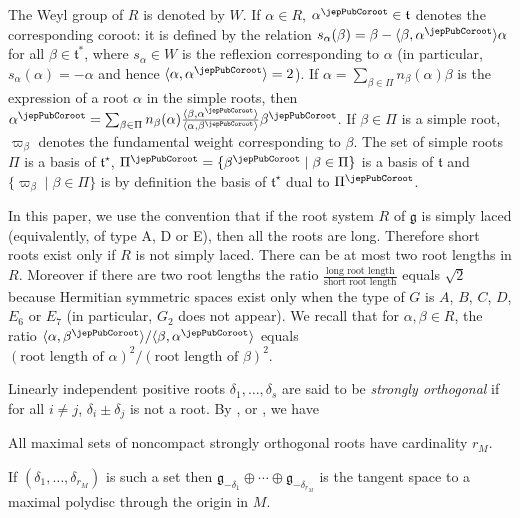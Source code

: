 The Weyl group of $R$ is denoted by $W$. If $\alpha\in R$, $\alpha^\jepPubCoroot\in\mathfrak t$ denotes the corresponding coroot: it is defined by the relation $s_\alpha(\beta)=\beta-\langle\beta,\alpha^\jepPubCoroot\rangle\alpha$ for all $\beta\in\mathfrak t^*$, where $s_\alpha\in W$ is the reflexion corresponding to $\alpha$ (in particular, $s_\alpha(\alpha)=-\alpha$ and hence $\langle\alpha,\alpha^\jepPubCoroot\rangle=2$). If $\alpha=\sum_{\beta\in\Pi}n_\beta(\alpha)\beta$ is the expression of a root $\alpha$ in the simple roots, then $\alpha^\jepPubCoroot=\sum_{\beta\in\Pi}n_\beta(\alpha)\frac{\langle\beta,\alpha^\jepPubCoroot\rangle}{\langle\alpha,\beta^\jepPubCoroot\rangle}\beta^\jepPubCoroot$. If $\beta\in\Pi$ is a simple root, $\varpi_\beta$ denotes the fundamental weight corresponding to $\beta$. The set of simple roots $\Pi$ is a basis of $\mathfrak t^{\star}$, $\Pi^\jepPubCoroot=\{\beta^\jepPubCoroot\mid\beta\in\Pi\}$ is a basis of $\mathfrak t$ and $\{\varpi_\beta\mid\beta\in\Pi\}$ is by definition the basis of $\mathfrak t^{\star}$ dual to $\Pi^\jepPubCoroot$.

In this paper, we use the convention that if the root system $R$ of $\mathfrak g$ is simply laced (equivalently, of type A, D or E), then all the roots are long. Therefore short roots exist only if $R$ is not simply laced. There can be at most two root lengths in $R$. Moreover if there are two root lengths the ratio $\frac{\text{long root length}}{\text{short root length}}$ equals $\sqrt2$ because Hermitian symmetric spaces exist only when the type of $G$ is $A$, $B$, $C$, $D$, $E_6$ or $E_7$ (in particular, $G_2$ does not appear). We recall that for $\alpha,\beta\in R$, the ratio $\langle\alpha,\beta^\jepPubCoroot\rangle/\langle\beta,\alpha^\jepPubCoroot\rangle$ equals $(\text{root length of }\alpha)^2/(\text{root length of }\beta)^2$.

Linearly independent positive roots $\delta_1,\ldots,\delta_s$ are said to be \emph{strongly orthogonal} if for all $i\neq j$, $\delta_i\pm\delta_j$ is not a root. By \cite{jep93HC56}, or \cite[Ch.~VIII, \S7]{jep93Hel01}, we have
\begin{fact}
All maximal sets of noncompact strongly orthogonal roots have cardinality $r_M$.
\end{fact}
If $(\delta_1,\ldots,\delta_{r_M})$ is such a set then $\mathfrak g_{-\delta_1}\oplus\cdots\oplus\mathfrak g_{-\delta_{r_M}}$ is the tangent space to a maximal polydisc through the origin in $M$.

